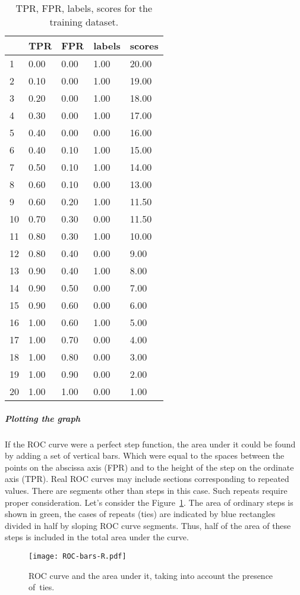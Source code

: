 \documentclass[]{scrreprt}
\begin{document}
\begin{table}[htp]
	\caption{TPR, FPR, labels, scores for the training dataset.}\label{tab:roc_df-r}
	\centering
	\begin{tabular}{lllll}
		\hline
		& TPR & FPR & labels & scores \\ 
		\hline
		1 & 0.00 & 0.00 & 1.00 & 20.00 \\ 
		2 & 0.10 & 0.00 & 1.00 & 19.00 \\ 
		3 & 0.20 & 0.00 & 1.00 & 18.00 \\ 
		4 & 0.30 & 0.00 & 1.00 & 17.00 \\ 
		5 & 0.40 & 0.00 & 0.00 & 16.00 \\ 
		6 & 0.40 & 0.10 & 1.00 & 15.00 \\ 
		7 & 0.50 & 0.10 & 1.00 & 14.00 \\ 
		8 & 0.60 & 0.10 & 0.00 & 13.00 \\ 
		9 & 0.60 & 0.20 & 1.00 & 11.50 \\ 
		10 & 0.70 & 0.30 & 0.00 & 11.50 \\ 
		11 & 0.80 & 0.30 & 1.00 & 10.00 \\ 
		12 & 0.80 & 0.40 & 0.00 & 9.00 \\ 
		13 & 0.90 & 0.40 & 1.00 & 8.00 \\ 
		14 & 0.90 & 0.50 & 0.00 & 7.00 \\ 
		15 & 0.90 & 0.60 & 0.00 & 6.00 \\ 
		16 & 1.00 & 0.60 & 1.00 & 5.00 \\ 
		17 & 1.00 & 0.70 & 0.00 & 4.00 \\ 
		18 & 1.00 & 0.80 & 0.00 & 3.00 \\ 
		19 & 1.00 & 0.90 & 0.00 & 2.00 \\ 
		20 & 1.00 & 1.00 & 0.00 & 1.00 \\ 
		\hline
	\end{tabular}
\end{table}
%
\subparagraph{Plotting the graph}
If the ROC curve were a perfect step function, the area under it could be found by adding a set of vertical bars. Which were equal to the spaces between the points on the abscissa axis (FPR) and to the height of the step on the ordinate axis (TPR). Real ROC curves may include sections corresponding to repeated values. There are segments other than steps in this case. Such repeats require proper consideration. Let's consider the Figure~\ref{fig:ROC-bars-R}. The area of ordinary steps is shown in green, the cases of repeats (ties) are indicated by blue rectangles divided in half by sloping ROC curve segments. Thus, half of the area of these steps is included in the total area under the curve.
%
\begin{figure}[htp]
	\centering
	\texttt{[image: ROC-bars-R.pdf]}
	\caption{ROC curve and the area under it, taking into account the presence of~ties.}
	\label{fig:ROC-bars-R}
\end{figure}
\end{document}
